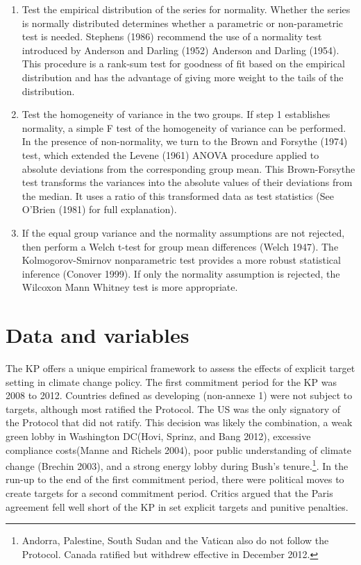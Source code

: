 \documentclass[
  10pt,
]{article}
\begin{document}
\begin{enumerate}
\def\labelenumi{\arabic{enumi}.}
\item
  Test the empirical distribution of the series for normality. Whether
  the series is normally distributed determines whether a parametric or
  non-parametric test is needed. Stephens (1986) recommend the use of a
  normality test introduced by Anderson and Darling (1952) Anderson and
  Darling (1954). This procedure is a rank-sum test for goodness of fit
  based on the empirical distribution and has the advantage of giving
  more weight to the tails of the distribution.
\item
  Test the homogeneity of variance in the two groups. If step 1
  establishes normality, a simple F test of the homogeneity of variance
  can be performed. In the presence of non-normality, we turn to the
  Brown and Forsythe (1974) test, which extended the Levene (1961) ANOVA
  procedure applied to absolute deviations from the corresponding group
  mean. This Brown-Forsythe test transforms the variances into the
  absolute values of their deviations from the median. It uses a ratio
  of this transformed data as test statistics (See O'Brien (1981) for
  full explanation).
\item
  If the equal group variance and the normality assumptions are not
  rejected, then perform a Welch t-test for group mean differences
  (Welch 1947). The Kolmogorov-Smirnov nonparametric test provides a
  more robust statistical inference (Conover 1999). If only the
  normality assumption is rejected, the Wilcoxon Mann Whitney test is
  more appropriate.
\end{enumerate}

\hypertarget{data-and-variables}{%
\section{Data and variables}\label{data-and-variables}}

The KP offers a unique empirical framework to assess the effects of
explicit target setting in climate change policy. The first commitment
period for the KP was 2008 to 2012. Countries defined as developing
(non-annexe 1) were not subject to targets, although most ratified the
Protocol. The US was the only signatory of the Protocol that did not
ratify. This decision was likely the combination, a weak green lobby in
Washington DC(Hovi, Sprinz, and Bang 2012), excessive compliance
costs(Manne and Richels 2004), poor public understanding of climate
change (Brechin 2003), and a strong energy lobby during Bush's
tenure.\footnote{Andorra, Palestine, South Sudan and the Vatican also do
  not follow the Protocol. Canada ratified but withdrew effective in
  December 2012.}. In the run-up to the end of the first commitment
period, there were political moves to create targets for a second
commitment period. Critics argued that the Paris agreement fell well
short of the KP in set explicit targets and punitive penalties.
\end{document}

